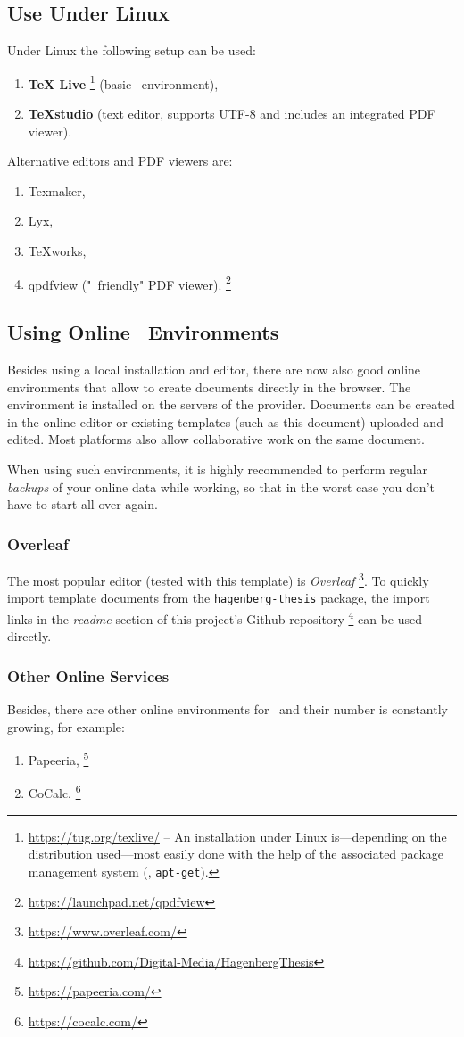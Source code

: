 \subsection{Use Under Linux}

Under Linux the following setup can be used:
%
\begin{enumerate}
	\item 
	\textbf{TeX Live}%
	\footnote{\url{https://tug.org/texlive/} -- An installation under Linux is---depending
	on the distribution used---most easily done with the help of the associated package
	management system (\eg, \texttt{apt-get}).}
	(basic \latex\ environment),
	\item \textbf{TeXstudio} (text editor, supports UTF-8 and includes an
	integrated PDF viewer).
\end{enumerate}
%
Alternative editors and PDF viewers are:
%
\begin{enumerate}
	\item Texmaker,%
	\item Lyx,%
	\item TeXworks,%
	\item qpdfview ("\latex\ friendly" PDF viewer).%
	\footnote{\url{https://launchpad.net/qpdfview}}
\end{enumerate}


\subsection{Using Online \latex\ Environments}

Besides using a local \latex installation and editor, there are now also good online 
environments that allow to create \latex documents directly in the browser.
The \latex environment is installed on the servers of the provider. Documents can be
created in the online editor or existing templates (such as this document) uploaded and 
edited. Most platforms also allow collaborative work on the same document.

When using such environments, it is highly recommended to perform regular \emph{backups} of your
online data while working, so that in the worst case you don't have to start all over 
again.

\subsubsection{Overleaf}

The most popular editor (tested with this template) is \emph{Overleaf}%
\footnote{\url{https://www.overleaf.com/}}.
To quickly import template documents from the \texttt{hagenberg-thesis} package, the 
import links in the \emph{readme} section of this project's Github repository%
\footnote{\url{https://github.com/Digital-Media/HagenbergThesis}}
can be used directly.


\subsubsection{Other Online Services}

Besides, there are other online environments for \latex\ and their number is constantly growing, for example:
%
\begin{enumerate}
	\item Papeeria,%
	\footnote{\url{https://papeeria.com/}}
	\item CoCalc.%
	\footnote{\url{https://cocalc.com/}}
\end{enumerate}
